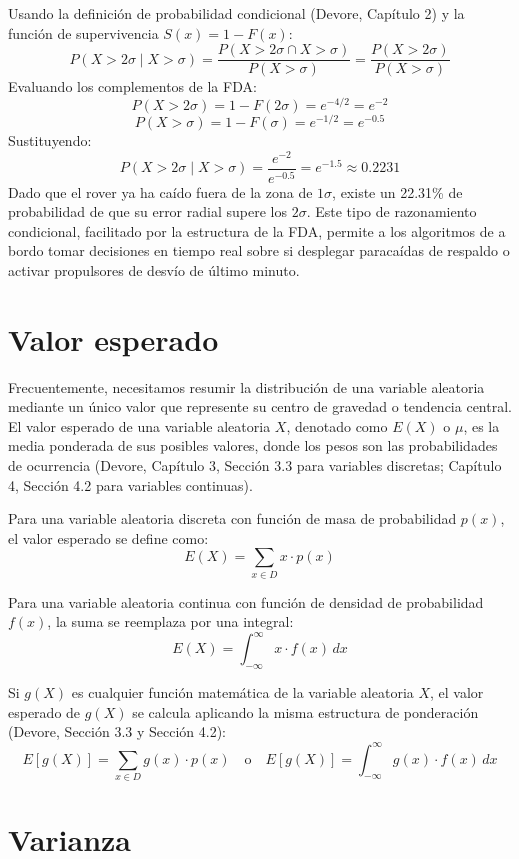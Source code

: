 Usando la definición de probabilidad condicional (Devore, Capítulo 2) y la función de supervivencia $S(x) = 1 - F(x)$:
$$ P(X > 2\sigma \mid X > \sigma) = \frac{P(X > 2\sigma \cap X > \sigma)}{P(X > \sigma)} = \frac{P(X > 2\sigma)}{P(X > \sigma)} $$
Evaluando los complementos de la FDA:
$$ P(X > 2\sigma) = 1 - F(2\sigma) = e^{-4/2} = e^{-2} $$
$$ P(X > \sigma) = 1 - F(\sigma) = e^{-1/2} = e^{-0.5} $$
Sustituyendo:
$$ P(X > 2\sigma \mid X > \sigma) = \frac{e^{-2}}{e^{-0.5}} = e^{-1.5} \approx 0.2231 $$
Dado que el rover ya ha caído fuera de la zona de $1\sigma$, existe un 22.31\% de probabilidad de que su error radial supere los $2\sigma$. Este tipo de razonamiento condicional, facilitado por la estructura de la FDA, permite a los algoritmos de a bordo tomar decisiones en tiempo real sobre si desplegar paracaídas de respaldo o activar propulsores de desvío de último minuto.

\section{Valor esperado}

Frecuentemente, necesitamos resumir la distribución de una variable aleatoria mediante un único valor que represente su centro de gravedad o tendencia central. El valor esperado de una variable aleatoria $X$, denotado como $E(X)$ o $\mu$, es la media ponderada de sus posibles valores, donde los pesos son las probabilidades de ocurrencia (Devore, Capítulo 3, Sección 3.3 para variables discretas; Capítulo 4, Sección 4.2 para variables continuas).

Para una variable aleatoria discreta con función de masa de probabilidad $p(x)$, el valor esperado se define como:
$$ E(X) = \sum_{x \in D} x \cdot p(x) $$

Para una variable aleatoria continua con función de densidad de probabilidad $f(x)$, la suma se reemplaza por una integral:
$$ E(X) = \int_{-\infty}^{\infty} x \cdot f(x) \, dx $$

Si $g(X)$ es cualquier función matemática de la variable aleatoria $X$, el valor esperado de $g(X)$ se calcula aplicando la misma estructura de ponderación (Devore, Sección 3.3 y Sección 4.2):
$$ E[g(X)] = \sum_{x \in D} g(x) \cdot p(x) \quad \text{o} \quad E[g(X)] = \int_{-\infty}^{\infty} g(x) \cdot f(x) \, dx $$

\section{Varianza}

